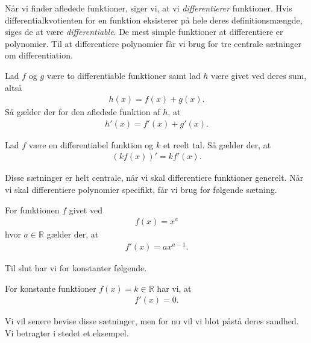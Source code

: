 Når vi finder afledede funktioner, siger vi, at vi \textit{differentierer} funktioner. Hvis differentialkvotienten for en funktion eksisterer på hele deres definitionsmængde, siges de at være \textit{differentiable}. De mest simple funktioner at differentiere er polynomier. Til at differentiere polynomier får vi brug for tre centrale sætninger om differentiation. 

\begin{setn}
	Lad $f$ og $g$ være to differentiable funktioner samt lad $h$ være givet ved deres sum, altså
	\begin{align*}
		h(x) = f(x) + g(x).
	\end{align*}
	Så gælder der for den afledede funktion af $h$, at 
	\begin{align*}
		h'(x) = f'(x) + g'(x).
	\end{align*}
\end{setn}
\begin{setn}
	Lad $f$ være en differentiabel funktion og $k$ et reelt tal. Så gælder der, at 
	\begin{align*}
		(kf(x))' = kf'(x).
	\end{align*}
\end{setn}
\newpage
Disse sætninger er helt centrale, når vi skal differentiere funktioner generelt. Når vi skal differentiere polynomier specifikt, får vi brug for følgende sætning.
\begin{setn}\label{setn:potens}
	For funktionen $f$ givet ved
	\begin{align*}
		f(x) = x^a
	\end{align*}
	hvor $a \in \mathbb{R}$ gælder der, at 
	\begin{align*}
		f'(x) = ax^{a-1}.
	\end{align*}
\end{setn}
Til slut har vi for konstanter følgende.
\begin{setn}
	For konstante funktioner $f(x) = k\in \mathbb{R}$ har vi, at 
	\begin{align*}
		f'(x) = 0.
	\end{align*}
\end{setn}
Vi vil senere bevise disse sætninger, men for nu vil vi blot påstå deres sandhed. Vi betragter i stedet et eksempel.
